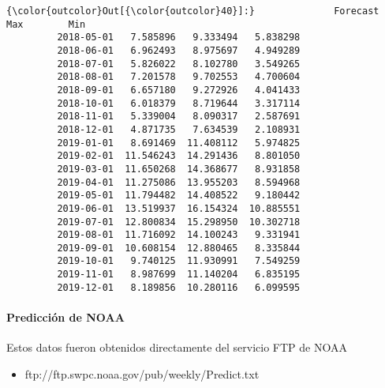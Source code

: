 \documentclass[11pt]{article}
\providecommand{\tightlist}{%
      \setlength{\itemsep}{0pt}\setlength{\parskip}{0pt}}
\begin{document}
\begin{Verbatim}[commandchars=\\\{\}]
{\color{outcolor}Out[{\color{outcolor}40}]:}              Forecast        Max        Min
         2018-05-01   7.585896   9.333494   5.838298
         2018-06-01   6.962493   8.975697   4.949289
         2018-07-01   5.826022   8.102780   3.549265
         2018-08-01   7.201578   9.702553   4.700604
         2018-09-01   6.657180   9.272926   4.041433
         2018-10-01   6.018379   8.719644   3.317114
         2018-11-01   5.339004   8.090317   2.587691
         2018-12-01   4.871735   7.634539   2.108931
         2019-01-01   8.691469  11.408112   5.974825
         2019-02-01  11.546243  14.291436   8.801050
         2019-03-01  11.650268  14.368677   8.931858
         2019-04-01  11.275086  13.955203   8.594968
         2019-05-01  11.794482  14.408522   9.180442
         2019-06-01  13.519937  16.154324  10.885551
         2019-07-01  12.800834  15.298950  10.302718
         2019-08-01  11.716092  14.100243   9.331941
         2019-09-01  10.608154  12.880465   8.335844
         2019-10-01   9.740125  11.930991   7.549259
         2019-11-01   8.987699  11.140204   6.835195
         2019-12-01   8.189856  10.280116   6.099595
\end{Verbatim}
            
    \hypertarget{predicciuxf3n-de-noaa}{%
\paragraph{Predicción de NOAA}\label{predicciuxf3n-de-noaa}}

    Estos datos fueron obtenidos directamente del servicio FTP de NOAA

\begin{itemize}
\tightlist
\item
  ftp://ftp.swpc.noaa.gov/pub/weekly/Predict.txt
\end{itemize}
\end{document}
